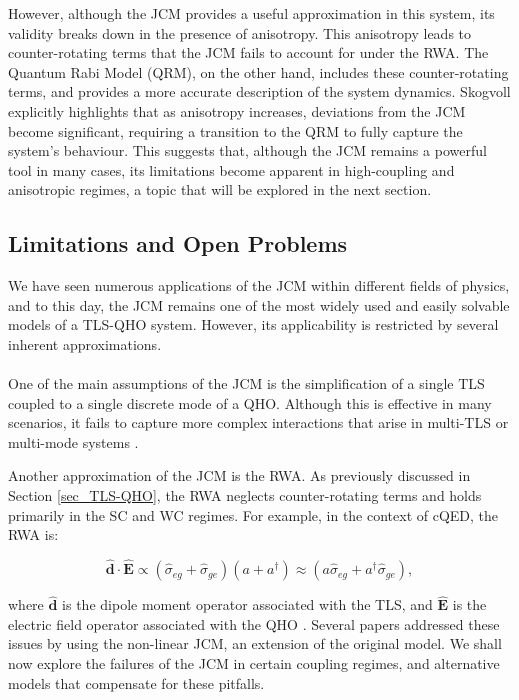 \documentclass[12pt,a4paper]{article}
\begin{document}
However, although the JCM provides a useful approximation in this system, its validity breaks down in the presence of anisotropy. This anisotropy leads to counter-rotating terms that the JCM fails to account for under the RWA. The Quantum Rabi Model (QRM), on the other hand, includes these counter-rotating terms, and provides a more accurate description of the system dynamics. Skogvoll explicitly highlights that as anisotropy increases, deviations from the JCM become significant, requiring a transition to the QRM to fully capture the system's behaviour. This suggests that, although the JCM remains a powerful tool in many cases, its limitations become apparent in high-coupling and anisotropic regimes, a topic that will be explored in the next section.

\subsection{Limitations and Open Problems} \label{subsec_limitations}

We have seen numerous applications of the JCM within different fields of physics, and to this day, the JCM remains one of the most widely used and easily solvable models of a TLS-QHO system. However, its applicability is restricted by several inherent approximations. \\
\\
One of the main assumptions of the JCM is the simplification of a single TLS coupled to a single discrete mode of a QHO. Although this is effective in many scenarios, it fails to capture more complex interactions that arise in multi-TLS or multi-mode systems \cite{General2024-JC_overview}.

Another approximation of the JCM is the RWA. As previously discussed in Section \ref{sec_TLS-QHO}, the RWA neglects counter-rotating terms and holds primarily in the SC and WC regimes. For example, in the context of cQED, the RWA is:

\begin{equation}
    \boldsymbol{\hat{d}}\cdot\boldsymbol{\hat{E}} \propto (\hat{\sigma}_{eg} + \hat{\sigma}_{ge})(a + a^\dagger)\approx (a\hat{\sigma}_{eg} + a^\dagger\hat{\sigma}_{ge}), \label{RWA}
\end{equation}

where $\boldsymbol{\hat{d}}$ is the dipole moment operator associated with the TLS, and $\boldsymbol{\hat{E}}$ is the electric field operator associated with the QHO \cite{General2024-JCM_relevance}. Several papers \cite{General2010_USC_failure, Context2024-CircuitQED} addressed these issues by using the non-linear JCM, an extension of the original model. 
We shall now explore the failures of the JCM in certain coupling regimes, and alternative models that compensate for these pitfalls.
\end{document}
